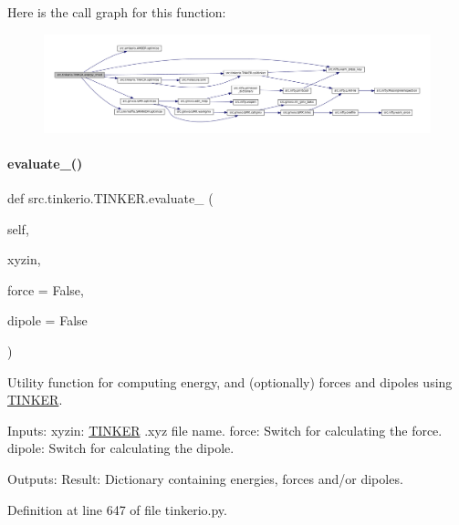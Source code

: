 Here is the call graph for this function\+:
\nopagebreak
\begin{figure}[H]
\begin{center}
\leavevmode
\includegraphics[width=350pt]{classsrc_1_1tinkerio_1_1TINKER_a4aa91827c8809aa5f1d8a07ef66482d6_cgraph}
\end{center}
\end{figure}
\mbox{\label{classsrc_1_1tinkerio_1_1TINKER_a49a7d06296ee436a170ebc13e518e7f6}} 
\paragraph{\texorpdfstring{evaluate\+\_\+()}{evaluate\_()}}
{\footnotesize\ttfamily def src.\+tinkerio.\+T\+I\+N\+K\+E\+R.\+evaluate\+\_\+ (\begin{DoxyParamCaption}\item[{}]{self,  }\item[{}]{xyzin,  }\item[{}]{force = {\ttfamily False},  }\item[{}]{dipole = {\ttfamily False} }\end{DoxyParamCaption})}



Utility function for computing energy, and (optionally) forces and dipoles using \hyperlink{classsrc_1_1tinkerio_1_1TINKER}{T\+I\+N\+K\+ER}. 

Inputs\+: xyzin\+: \hyperlink{classsrc_1_1tinkerio_1_1TINKER}{T\+I\+N\+K\+ER} .xyz file name. force\+: Switch for calculating the force. dipole\+: Switch for calculating the dipole.

Outputs\+: Result\+: Dictionary containing energies, forces and/or dipoles. 

Definition at line 647 of file tinkerio.\+py.

